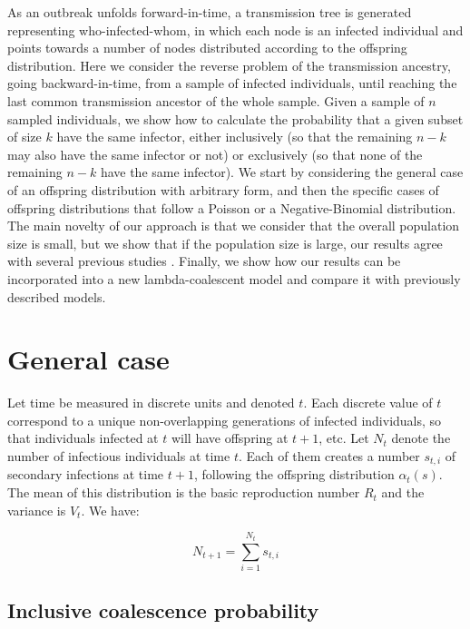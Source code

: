 \documentclass{article}
\begin{document}
As an outbreak unfolds forward-in-time, a transmission tree is generated representing who-infected-whom,
in which each node is an infected individual and points towards a number of nodes distributed according
to the offspring distribution. Here we consider the reverse problem of the transmission ancestry, going backward-in-time, from a sample of infected individuals, until reaching the last common 
transmission ancestor of the whole sample. Given a sample of $n$ sampled individuals,
we show how to calculate the probability that a given subset of size $k$ have the same infector,
either inclusively (so that the remaining $n-k$ may also have the same infector or not)
or exclusively (so that none of the remaining $n-k$ have the same infector). We start
by considering the general case of an offspring distribution with arbitrary form, 
and then the specific cases of 
offspring distributions that follow a Poisson or a Negative-Binomial distribution.
The main novelty of our approach is that we consider that the overall population size is small,
but we show that if the population size is large, our results agree with several previous
studies \citep{Volz2012a,koelleRatesCoalescenceCommon2012,Fraser2017}.
Finally, we show how our results can be incorporated into a new lambda-coalescent model 
\citep{pitmanCoalescentsMultipleCollisions1999,sagitovGeneralCoalescentAsynchronous1999,
donnellyParticleRepresentationsMeasureValued1999} and compare it with previously
described models.

\section{General case}

Let time be measured in discrete units and denoted $t$. Each discrete value of $t$ correspond to a unique non-overlapping 
generations of infected individuals, so that individuals infected at $t$ will have offspring at $t+1$, etc. 
Let $N_t$ denote the number of infectious individuals at time $t$. Each of them creates a number $s_{t,i}$ of secondary infections at time $t+1$, following the offspring distribution $\alpha_t(s)$. The mean of this distribution is the basic reproduction number $R_t$ and the variance is $V_t$. We have:

\begin{equation}
N_{t+1}=\sum_{i=1}^{N_t} s_{t,i}
\label{eq:summation}
\end{equation}

\subsection{Inclusive coalescence probability}
\end{document}
